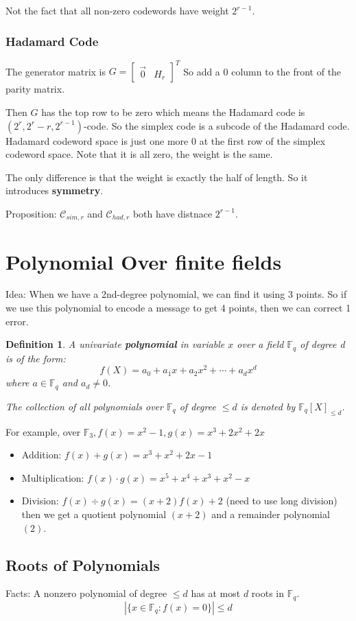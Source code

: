 \documentclass[letterpaper,12pt]{article}
\newtheorem{definition}{Definition}
\begin{document}
Not the fact that all non-zero codewords have weight $2^{r-1}$.
\subsubsection{Hadamard Code}
The generator matrix is $G=\begin{bmatrix}
        \vec{0} & H_r
    \end{bmatrix}^T$ So add a 0 column to the front of the parity matrix.

Then $G$ has the top row to be zero which means the Hadamard code is
$(2^r,2^r-r,2^{r-1})$-code. So the simplex code is a subcode of the Hadamard
code. Hadamard codeword space is just one more 0 at the first row of the
simplex codeword space. Note that it is all zero, the weight is the same.

The only difference is that the weight is exactly the half of length. So it
introduces \textbf{symmetry}.

Proposition: $\mathcal{C}_{sim,r}$ and $\mathcal{C}_{had,r}$ both have distnace
$2^{r-1}$.
\section{Polynomial Over finite fields}
Idea: When we have a 2nd-degree polynomial, we can find it using 3 points. So
if we use this polynomial to encode a message to get 4 points, then we can
correct 1 error.

\begin{definition}
    A univariate \textbf{polynomial} in variable $x$ over a field $\mathbb{F}_q$ of degree d is of the form: \[
        f(X)=a_0+a_1x+a_2x^2+\cdots+a_d x^d
    \]
    where $a\in \mathbb{F}_q$ and $a_d\neq 0$.

    The collection of all polynomials over $\mathbb{F}_q$ of degree $\le d$ is
    denoted by $\mathbb{F}_q[X]_{\le d}$.
\end{definition}

For example, over $\mathbb{F}_3, f(x) = x^2-1, g(x) = x^3+2x^2+2x$ \begin{itemize}
    \item Addition: $f(x)+g(x) = x^3+x^2+2x-1$
    \item Multiplication: $f(x)\cdot g(x) = x^5+x^4+x^3+x^2-x$
    \item Division: $f(x)\div g(x) = (x+2)f(x)+2$ (need to use long division) then we get
          a quotient polynomial $(x+2)$ and a remainder polynomial $(2)$.
\end{itemize}
\subsection{Roots of Polynomials}
Facts: A nonzero polynomial of degree $\le d$ has at most $d$ roots in
$\mathbb{F}_q$. \[|\{x\in\mathbb{F}_q:f(x)=0\}|\le d\]
\end{document}
